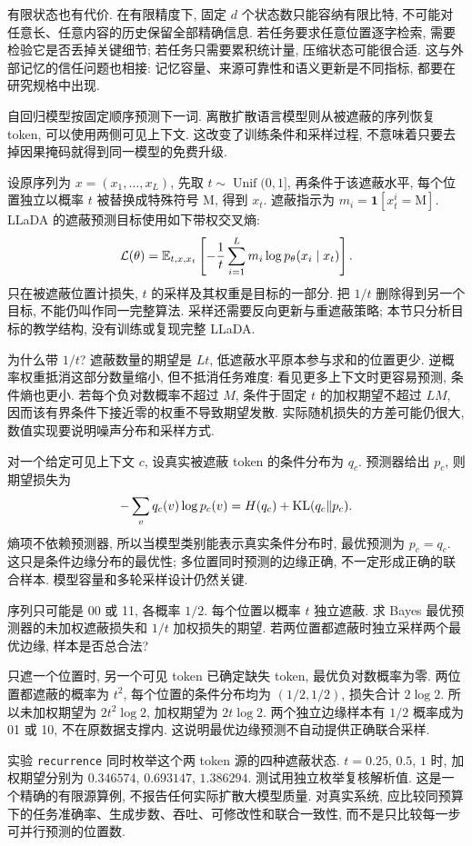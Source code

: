 有限状态也有代价. 在有限精度下, 固定 $d$ 个状态数只能容纳有限比特, 不可能对任意长、任意内容的历史保留全部精确信息. 若任务要求任意位置逐字检索, 需要检验它是否丢掉关键细节; 若任务只需要累积统计量, 压缩状态可能很合适. 这与外部记忆的信任问题也相接: 记忆容量、来源可靠性和语义更新是不同指标, 都要在研究规格中出现.

自回归模型按固定顺序预测下一词. 离散扩散语言模型则从被遮蔽的序列恢复 token, 可以使用两侧可见上下文. 这改变了训练条件和采样过程, 不意味着只要去掉因果掩码就得到同一模型的免费升级.

设原序列为 $x=(x_1,\ldots,x_L)$, 先取 $t\sim\operatorname{Unif}(0,1]$, 再条件于该遮蔽水平, 每个位置独立以概率 $t$ 被替换成特殊符号 M, 得到 $x_t$. 遮蔽指示为 $m_i=\mathbf1[x_t^i=\mathrm M]$. LLaDA 的遮蔽预测目标使用如下带权交叉熵\cite{llada}:
\[
\mathcal L(\theta)=\mathbb E_{t,x,x_t}\left[-\frac1t\sum_{i=1}^Lm_i\log p_\theta(x_i\mid x_t)\right].
\]
只在被遮蔽位置计损失, $t$ 的采样及其权重是目标的一部分. 把 $1/t$ 删除得到另一个目标, 不能仍叫作同一完整算法. 采样还需要反向更新与重遮蔽策略; 本节只分析目标的教学结构, 没有训练或复现完整 LLaDA.

为什么带 $1/t$? 遮蔽数量的期望是 $Lt$, 低遮蔽水平原本参与求和的位置更少. 逆概率权重抵消这部分数量缩小, 但不抵消任务难度: 看见更多上下文时更容易预测, 条件熵也更小. 若每个负对数概率不超过 $M$, 条件于固定 $t$ 的加权期望不超过 $LM$, 因而该有界条件下接近零的权重不导致期望发散. 实际随机损失的方差可能仍很大, 数值实现要说明噪声分布和采样方式.

对一个给定可见上下文 $c$, 设真实被遮蔽 token 的条件分布为 $q_c$. 预测器给出 $p_c$, 则期望损失为
\[
-\sum_vq_c(v)\log p_c(v)=H(q_c)+\operatorname{KL}(q_c\|p_c).
\]
熵项不依赖预测器, 所以当模型类别能表示真实条件分布时, 最优预测为 $p_c=q_c$. 这只是条件边缘分布的最优性; 多位置同时预测的边缘正确, 不一定形成正确的联合样本. 模型容量和多轮采样设计仍然关键.

\begin{example}
序列只可能是 00 或 11, 各概率 $1/2$. 每个位置以概率 $t$ 独立遮蔽. 求 Bayes 最优预测器的未加权遮蔽损失和 $1/t$ 加权损失的期望. 若两位置都遮蔽时独立采样两个最优边缘, 样本是否总合法?
\end{example}
\begin{solution}
只遮一个位置时, 另一个可见 token 已确定缺失 token, 最优负对数概率为零. 两位置都遮蔽的概率为 $t^2$, 每个位置的条件分布均为 $(1/2,1/2)$, 损失合计 $2\log2$. 所以未加权期望为 $2t^2\log2$, 加权期望为 $2t\log2$. 两个独立边缘样本有 $1/2$ 概率成为 01 或 10, 不在原数据支撑内. 这说明最优边缘预测不自动提供正确联合采样.
\end{solution}
实验 \texttt{recurrence} 同时枚举这个两 token 源的四种遮蔽状态. $t=0.25$, $0.5$, $1$ 时, 加权期望分别为 $0.346574$, $0.693147$, $1.386294$. 测试用独立枚举复核解析值. 这是一个精确的有限源算例, 不报告任何实际扩散大模型质量. 对真实系统, 应比较同预算下的任务准确率、生成步数、吞吐、可修改性和联合一致性, 而不是只比较每一步可并行预测的位置数.

